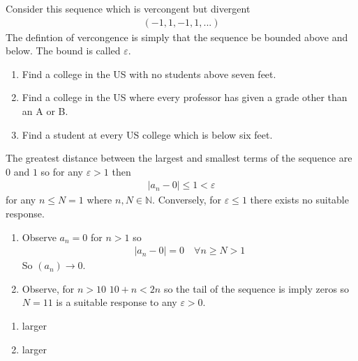 Consider this sequence which is vercongent but divergent
\begin{align*}
    (-1,1,-1,1,...)
\end{align*}
The defintion of vercongence is simply that the sequence be bounded above and 
below. The bound is called $\varepsilon$.

\begin{enumerate}[label=(\alph*)]
    \item Find a college in the US with no students above seven feet.
    \item Find a college in the US where every professor has given a
    grade other than an A or B.
    \item Find a student at every US college which is below six feet.
\end{enumerate}

The greatest distance between the largest and smallest terms of the sequence
 are $0$ and $1$ so for any $\varepsilon > 1$ then 
 \begin{align*}
    |a_n - 0| \leq 1 < \varepsilon
 \end{align*}
 for any $n \leq N = 1$ where $n, N \in \mathbb{N}$. Conversely, for $\varepsilon \leq 1$
 there exists no suitable response.

 \begin{enumerate}[label=(\alph*)]
    \item 
    Observe $a_n = 0$ for $n > 1$ so 
    \begin{align*}
        |a_n - 0| = 0 \quad \forall n \geq N > 1 
    \end{align*}
    So $(a_n) \rightarrow 0$.

    \item 
    Observe, for $n>10$ $10+n < 2n$ so the tail of the sequence is imply zeros so
    $N = 11$ is a suitable response to any $\varepsilon > 0$.
 \end{enumerate}

\begin{enumerate}[label=(\alph*)]
    \item larger
    \item larger
\end{enumerate}

